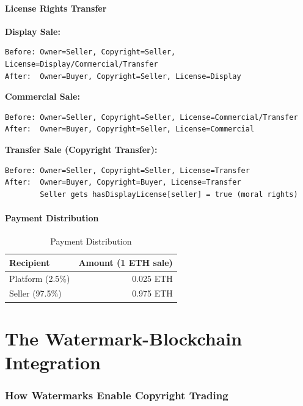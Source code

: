 \documentclass[11pt,a4paper]{article}
\begin{document}
\subsection{License Rights Transfer}

\textbf{Display Sale:}
\begin{verbatim}
Before: Owner=Seller, Copyright=Seller, License=Display/Commercial/Transfer
After:  Owner=Buyer, Copyright=Seller, License=Display
\end{verbatim}

\textbf{Commercial Sale:}
\begin{verbatim}
Before: Owner=Seller, Copyright=Seller, License=Commercial/Transfer
After:  Owner=Buyer, Copyright=Seller, License=Commercial
\end{verbatim}

\textbf{Transfer Sale (Copyright Transfer):}
\begin{verbatim}
Before: Owner=Seller, Copyright=Seller, License=Transfer
After:  Owner=Buyer, Copyright=Buyer, License=Transfer
        Seller gets hasDisplayLicense[seller] = true (moral rights)
\end{verbatim}

\subsection{Payment Distribution}

\begin{table}[h]
\centering
\begin{tabular}{@{}lr@{}}
\toprule
\textbf{Recipient} & \textbf{Amount (1 ETH sale)} \\
\midrule
Platform (2.5\%) & 0.025 ETH \\
Seller (97.5\%) & 0.975 ETH \\
\bottomrule
\end{tabular}
\caption{Payment Distribution}
\end{table}

\newpage
\part{The Watermark-Blockchain Integration}

\section{How Watermarks Enable Copyright Trading}
\end{document}
